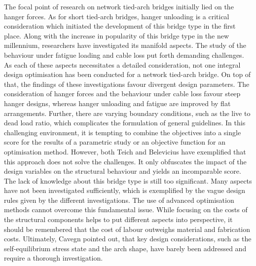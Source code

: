 The focal point of research on network tied-arch bridges initially lied on the hanger forces. As for short tied-arch bridges, hanger unloading is a critical consideration which initiated the development of this bridge type in the first place.
Along with the increase in popularity of this bridge type in the new millennium, researchers have investigated its manifold aspects. The study of the behaviour under fatigue loading and cable loss put forth demanding challenges. As each of these aspects necessitates a detailed consideration, not one integral design optimisation has been conducted for a network tied-arch bridge. On top of that, the findings of these investigations favour divergent design parameters. The consideration of hanger forces and the behaviour under cable loss favour steep hanger designs, whereas hanger unloading and fatigue are improved by flat arrangements. Further, there are varying boundary conditions, such as the live to dead load ratio, which complicates the formulation of general guidelines. In this challenging environment, it is tempting to combine the objectives into a single score for the results of a parametric study or an objective function for an optimisation method. However, both Teich and Belevicius have exemplified that this approach does not solve the challenges. It only obfuscates the impact of the design variables on the structural behaviour and yields an incomparable score. The lack of knowledge about this bridge type is still too significant. Many aspects have not been investigated sufficiently, which is exemplified by the vague design rules given by the different investigations. The use of advanced optimisation methods cannot overcome this fundamental issue. While focusing on the costs of the structural components helps to put different aspects into perspective, it should be remembered that the cost of labour outweighs material and fabrication costs. Ultimately, Cavegn pointed out, that key design considerations, such as the self-equilibrium stress state and the arch shape, have barely been addressed and require a thorough investigation.








